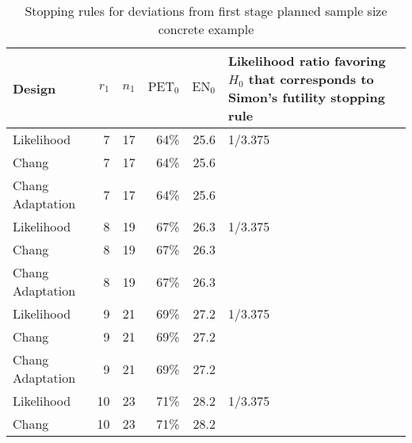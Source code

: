 \documentclass[12pt]{report}\usepackage[]{graphicx}\usepackage[]{color}
\newlength{\li}\setlength{\li}{14.48pt}
\begin{document}
\begin{table}[H]
\centering
\caption{Stopping rules for deviations from first stage planned sample size concrete example}
\hspace*{-3.5cm}
\begin{tabular}{|L|R|R|R|R|L|}
\hline
Design           & $r_1$ & $n_1$ & $\mbox{PET}_0$ & $\mbox{EN}_0$ & Likelihood ratio favoring $H_0$ that corresponds to Simon's futility stopping rule \\ \hline
Likelihood       & 7     & 17    & 64\%           & 25.6          & 1/3.375                                                                            \\ \hline
Chang            & 7     & 17    & 64\%           & 25.6          &                                                                                    \\ \hline
Chang Adaptation & 7     & 17    & 64\%           & 25.6          &                                                                                    \\ \hline
Likelihood       & 8     & 19    & 67\%           & 26.3          & 1/3.375                                                                            \\ \hline
Chang            & 8     & 19    & 67\%           & 26.3          &                                                                                    \\ \hline
Chang Adaptation & 8     & 19    & 67\%           & 26.3          &                                                                                    \\ \hline
Likelihood       & 9     & 21    & 69\%           & 27.2          & 1/3.375                                                                            \\ \hline
Chang            & 9     & 21    & 69\%           & 27.2          &                                                                                    \\ \hline
Chang Adaptation & 9     & 21    & 69\%           & 27.2          &                                                                                    \\ \hline
Likelihood       & 10    & 23    & 71\%           & 28.2          & 1/3.375                                                                            \\ \hline
Chang            & 10    & 23    & 71\%           & 28.2          &                                                                                    \\ \hline

\end{tabular}
\end{table}
\end{document}
